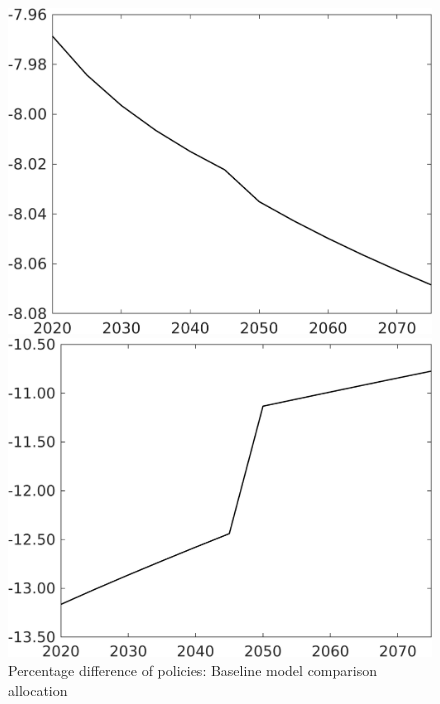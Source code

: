 \documentclass[12pt]{article}
\begin{document}
\begin{figure}[h!!]
	\centering
	\caption{Percentage difference of policies: Baseline model comparison allocation}\label{fig:Pertauf_nsk0_xgr12}
	
	\begin{minipage}[]{0.32\textwidth}
		\includegraphics[width=1\textwidth]{../../codding_model/own_basedOnFried/optimalPol_010922_revision/figures/all_13Sept22/CompTaufPER_bytaul_Reg0_N_spillover0_nsk0_xgr1_knspil0_sep1_LFlimit1_emsbase0_countec0_GovRev0_etaa0.79_lgd0.png}
	\end{minipage}	
	\begin{minipage}[]{0.32\textwidth}
		\includegraphics[width=1\textwidth]{../../codding_model/own_basedOnFried/optimalPol_010922_revision/figures/all_13Sept22/CompTaufPER_bytaul_Reg0_G_spillover0_nsk0_xgr1_knspil0_sep1_LFlimit1_emsbase0_countec0_GovRev0_etaa0.79_lgd0.png}

\end{minipage}
\end{figure}
\end{document}
